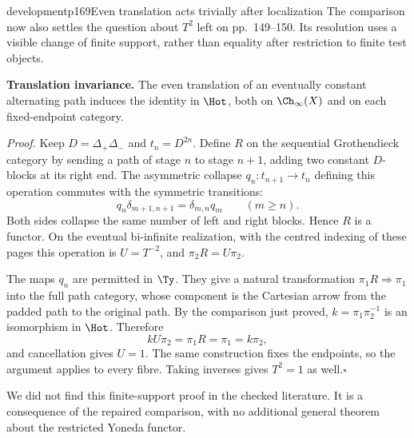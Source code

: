 \begin{dcomment}{development}{p169}{Even translation acts trivially after localization}
The comparison now also settles the question about $T^2$ left on pp.~149--150. Its resolution uses a visible change of finite support, rather than equality after restriction to finite test objects.

\textbf{Translation invariance.}\ours\quad
The even translation of an eventually constant alternating path induces the identity in $\Hot$, both on $\Ch_\infty(X)$ and on each fixed-endpoint category.

\emph{Proof.} Keep $D=\Delta_+\Delta_-$ and $t_n=D^{2n}$. Define $R$ on the sequential Grothendieck category by sending a path of stage $n$ to stage $n+1$, adding two constant $D$-blocks at its right end. The asymmetric collapse $q_n:t_{n+1}\to t_n$ defining this operation commutes with the symmetric transitions:
\[
 q_n\delta_{m+1,n+1}=\delta_{m,n}q_m\qquad(m\geq n).
\]
Both sides collapse the same number of left and right blocks. Hence $R$ is a functor. On the eventual bi-infinite realization, with the centred indexing of these pages this operation is $U=T^{-2}$, and $\pi_2R=U\pi_2$.

The maps $q_n$ are permitted in $\Ty$. They give a natural transformation $\pi_1R\Rightarrow\pi_1$ into the full path category, whose component is the Cartesian arrow from the padded path to the original path. By the comparison just proved, $k=\pi_1\pi_2^{-1}$ is an isomorphism in $\Hot$. Therefore
\[
 kU\pi_2=\pi_1R=\pi_1=k\pi_2,
\]
and cancellation gives $U=1$. The same construction fixes the endpoints, so the argument applies to every fibre. Taking inverses gives $T^2=1$ as well.\hfill$\square$

We did not find this finite-support proof in the checked literature. It is a consequence of the repaired comparison, with no additional general theorem about the restricted Yoneda functor.
\end{dcomment}

